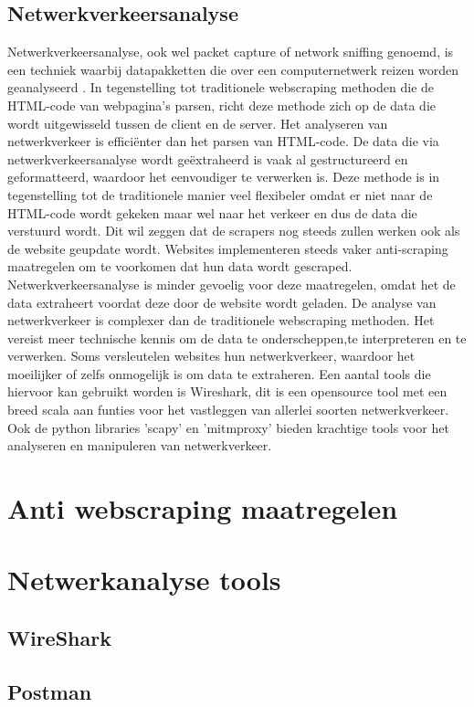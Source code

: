 \subsection{Netwerkverkeersanalyse}

Netwerkverkeersanalyse, ook wel packet capture of network sniffing genoemd, is een techniek waarbij datapakketten die over een computernetwerk reizen worden geanalyseerd \autocite{Chapple2018}.  In tegenstelling tot traditionele webscraping methoden die de HTML-code van webpagina’s parsen, richt deze methode zich op de data die wordt uitgewisseld tussen de client en de server. Het analyseren van netwerkverkeer is efficiënter dan het parsen van HTML-code.  De
data die via netwerkverkeersanalyse wordt geëxtraheerd is vaak al gestructureerd en geformatteerd, waardoor het eenvoudiger te verwerken is.
Deze methode is in tegenstelling tot de traditionele manier veel flexibeler omdat er niet naar de
HTML-code wordt gekeken maar wel naar het verkeer en dus de data die verstuurd wordt. Dit wil
zeggen dat de scrapers nog steeds zullen werken
ook als de website geupdate wordt. Websites implementeren steeds vaker anti-scraping maatregelen om te voorkomen dat hun data wordt gescraped. Netwerkverkeersanalyse is minder gevoelig voor deze maatregelen, omdat het de data
extraheert voordat deze door de website wordt
geladen. De analyse van netwerkverkeer is
complexer dan de traditionele webscraping methoden. Het vereist meer technische kennis om
de data te onderscheppen,te interpreteren en te
verwerken. Soms versleutelen websites hun netwerkverkeer, waardoor het moeilijker of zelfs onmogelijk is om data te extraheren. Een aantal tools die hiervoor kan gebruikt worden is Wireshark,
dit is een opensource tool met een breed scala
aan funties voor het vastleggen van allerlei soorten netwerkverkeer. Ook de python libraries ’scapy’
en ’mitmproxy’ bieden krachtige tools voor het
analyseren en manipuleren van netwerkverkeer.

\section{Anti webscraping maatregelen}

\section{Netwerkanalyse tools}
\subsection{WireShark}
\subsection{Postman}

